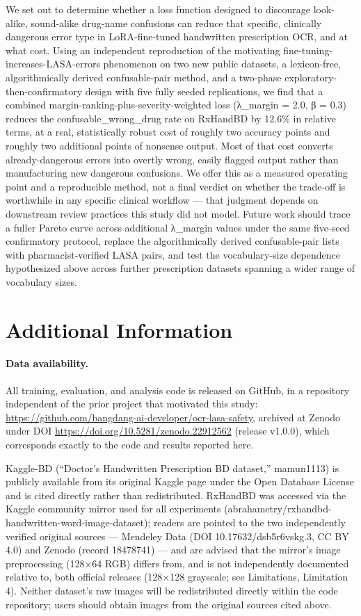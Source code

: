 \documentclass[fleqn,10pt]{wlpeerj}
\begin{document}
We set out to determine whether a loss function designed to discourage look-alike, sound-alike drug-name confusions can reduce that specific, clinically dangerous error type in LoRA-fine-tuned handwritten prescription OCR, and at what cost. Using an independent reproduction of the motivating fine-tuning-increases-LASA-errors phenomenon on two new public datasets, a lexicon-free, algorithmically derived confusable-pair method, and a two-phase exploratory-then-confirmatory design with five fully seeded replications, we find that a combined margin-ranking-plus-severity-weighted loss (λ\_margin = 2.0, β = 0.3) reduces the confusable\_wrong\_drug rate on RxHandBD by 12.6\% in relative terms, at a real, statistically robust cost of roughly two accuracy points and roughly two additional points of nonsense output. Most of that cost converts already-dangerous errors into overtly wrong, easily flagged output rather than manufacturing new dangerous confusions. We offer this as a measured operating point and a reproducible method, not a final verdict on whether the trade-off is worthwhile in any specific clinical workflow --- that judgment depends on downstream review practices this study did not model. Future work should trace a fuller Pareto curve across additional λ\_margin values under the same five-seed confirmatory protocol, replace the algorithmically derived confusable-pair lists with pharmacist-verified LASA pairs, and test the vocabulary-size dependence hypothesized above across further prescription datasets spanning a wider range of vocabulary sizes.

\section*{Additional Information}\label{sec:additional-information}

\paragraph{Data availability.} All training, evaluation, and analysis code is released on GitHub, in a repository independent of the prior project that motivated this study: \url{https://github.com/bangdang-ai-developer/ocr-lasa-safety}, archived at Zenodo under DOI \url{https://doi.org/10.5281/zenodo.22912562} (release v1.0.0), which corresponds exactly to the code and results reported here.

Kaggle-BD (``Doctor's Handwritten Prescription BD dataset,'' mamun1113) is publicly available from its original Kaggle page under the Open Database License and is cited directly rather than redistributed. RxHandBD was accessed via the Kaggle community mirror used for all experiments (abrahametry/rxhandbd-handwritten-word-image-dataset); readers are pointed to the two independently verified original sources --- Mendeley Data (DOI 10.17632/dsb5r6vskg.3, CC BY 4.0) and Zenodo (record 18478741) --- and are advised that the mirror's image preprocessing (128×64 RGB) differs from, and is not independently documented relative to, both official releases (128×128 grayscale; see Limitations, Limitation 4). Neither dataset's raw images will be redistributed directly within the code repository; users should obtain images from the original sources cited above.
\end{document}
